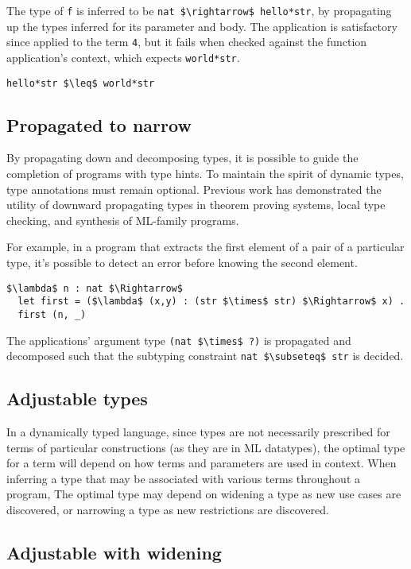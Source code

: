 \documentclass[manuscript]{acmart}
\theoremstyle{definition}
\begin{document}
The type of \lstinline{f} is inferred to be \lstinline{nat $\rightarrow$ hello*str}, 
by propagating up the types inferred for its parameter and body.
The application is satisfactory since applied to the term \lstinline{4}, 
but it fails when checked against the function application's context,
which expects \lstinline{world*str}.
\begin{lstlisting}
hello*str $\leq$ world*str
\end{lstlisting}

\subsection{Propagated to narrow}
By propagating down and decomposing types, 
it is possible to guide the completion of programs with type hints.
To maintain the spirit of dynamic types, type annotations must remain optional.
Previous work has demonstrated the utility of downward propagating types 
in theorem proving systems, local type checking, 
and synthesis of ML-family programs.

For example, in a program that extracts 
the first element of a pair of a particular type, 
it's possible to detect an error before knowing the second element.

\begin{lstlisting}
$\lambda$ n : nat $\Rightarrow$
  let first = ($\lambda$ (x,y) : (str $\times$ str) $\Rightarrow$ x) .
  first (n, _) 
\end{lstlisting}

\noindent The  applications' argument type \lstinline{(nat $\times$ ?)} 
is propagated and decomposed such that the subtyping constraint 
\lstinline{nat $\subseteq$ str} is decided. 

\subsection{Adjustable types}

In a dynamically typed language, since types are not necessarily prescribed
for terms of particular constructions (as they are in ML datatypes), 
the optimal type for a term will depend on how terms and parameters are used in context. 
When inferring a type that may be associated with various terms throughout a program,  
The optimal type may depend on widening a type as new use cases are discovered,
or narrowing a type as new restrictions are discovered. 

\subsection{Adjustable with widening}
\end{document}
